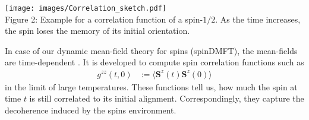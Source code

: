 \documentclass[20pt]{article}
\newcommand{\mb}{\mathbf} %
\newcommand{\mcaption}[2]{ \\ Figure {#1}: {#2} } %
\begin{document}
\begin{minipage}{0.44\textwidth}
    \begin{center}
        \texttt{[image: images/Correlation\_sketch.pdf]}
        \mcaption{2}{Example for a correlation function of a spin-$1/2$. %
        As the time increases, the spin loses the memory of its initial orientation.}
    \end{center}
\end{minipage}
\hspace{0.01\textwidth}
\begin{minipage}{0.54\textwidth}
    In case of our dynamic mean-field theory for spins (spinDMFT), the mean-fields are time-dependent \cite{graes21}. It is developed to compute spin correlation functions such as 
    \begin{align*}
        g^{zz}(t,0) &:= \langle \mb{S}^{z}(t) \mb{S}^{z}(0) \rangle
    \end{align*}
    in the limit of large temperatures. These functions tell us, how much the spin at time $t$ is still correlated to its initial alignment. Correspondingly, they capture the 
    decoherence induced by the spins environment.     
\end{minipage}
\vspace{2mm}
\end{document}
